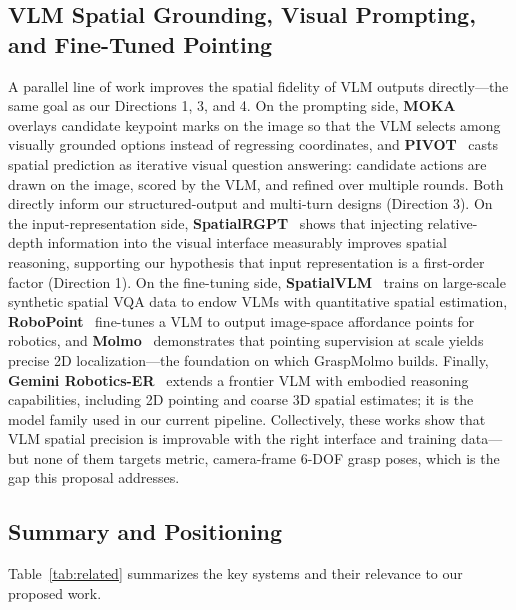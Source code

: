 \documentclass[11pt,a4paper]{article}
\begin{document}
\subsection{VLM Spatial Grounding, Visual Prompting, and Fine-Tuned Pointing}

A parallel line of work improves the spatial fidelity of VLM outputs directly---the same goal as our Directions 1, 3, and 4. On the prompting side, \textbf{MOKA}~\cite{liu2024moka} overlays candidate keypoint marks on the image so that the VLM selects among visually grounded options instead of regressing coordinates, and \textbf{PIVOT}~\cite{nasiriany2024pivot} casts spatial prediction as iterative visual question answering: candidate actions are drawn on the image, scored by the VLM, and refined over multiple rounds. Both directly inform our structured-output and multi-turn designs (Direction 3). On the input-representation side, \textbf{SpatialRGPT}~\cite{cheng2024spatialrgpt} shows that injecting relative-depth information into the visual interface measurably improves spatial reasoning, supporting our hypothesis that input representation is a first-order factor (Direction 1). On the fine-tuning side, \textbf{SpatialVLM}~\cite{chen2024spatialvlm} trains on large-scale synthetic spatial VQA data to endow VLMs with quantitative spatial estimation, \textbf{RoboPoint}~\cite{yuan2024robopoint} fine-tunes a VLM to output image-space affordance points for robotics, and \textbf{Molmo}~\cite{deitke2025molmo} demonstrates that pointing supervision at scale yields precise 2D localization---the foundation on which GraspMolmo builds. Finally, \textbf{Gemini Robotics-ER}~\cite{gemini2025robotics} extends a frontier VLM with embodied reasoning capabilities, including 2D pointing and coarse 3D spatial estimates; it is the model family used in our current pipeline. Collectively, these works show that VLM spatial precision is improvable with the right interface and training data---but none of them targets metric, camera-frame 6-DOF grasp poses, which is the gap this proposal addresses.

\subsection{Summary and Positioning}

Table~\ref{tab:related} summarizes the key systems and their relevance to our proposed work.
\end{document}

